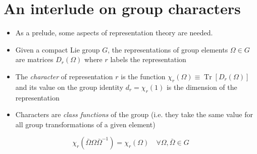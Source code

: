 \section{An interlude on group characters}

\begin{itemize}
\item As a prelude, some aspects of representation theory are needed.
\item Given a compact Lie group $G$, the representations of group elements $\Omega \in G$ are matrices $D_r(\Omega)$ where $r$ labels the representation
\item The \emph{character} of representation $r$ is the function $\chi_r(\Omega) \equiv \operatorname{Tr}[D_r(\Omega)]$ and its value on the group identity $d_r = \chi_r(1)$ is the dimension of the representation
\item Characters are \emph{class functions} of the group (i.e. they take the same value for all group transformations of a given element)
\end{itemize}

\begin{equation}
\chi_{r}\left(\bar{\Omega} \Omega \bar{\Omega}^{-1}\right)=\chi_{r}(\Omega) \quad \forall \Omega, \bar{\Omega} \in G
\end{equation}

